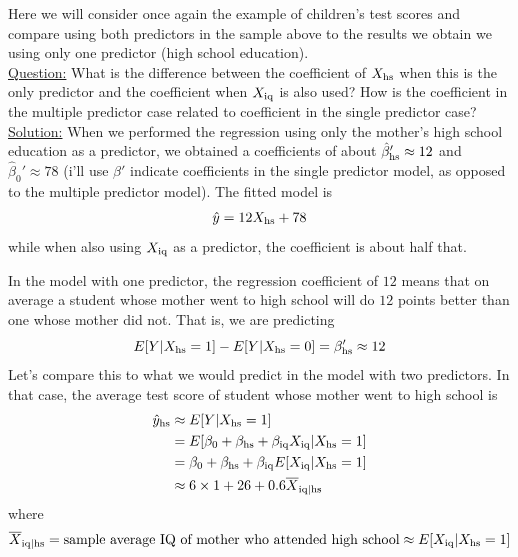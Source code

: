 \begin{example}
Here we will consider once again the example of children's test scores and compare using both predictors in the sample above to the results we obtain we using only one predictor (high school education). \\



\noindent
\underline{Question:} What is the difference between the coefficient of $X_{\rm hs}$ when this is the only predictor and the coefficient when $X_{\rm iq}$ is also used? How is the coefficient in the multiple predictor case related to coefficient in the single predictor case?  \\

\noindent
\underline{Solution:} When we performed the regression using only the mother's high school education as a predictor, we obtained a coefficients of about $\hat{\beta}_{\rm hs}' \approx 12$ and $\hat{\beta}_0' \approx 78$ (i'll use $\beta'$ indicate coefficients in the single predictor model, as opposed to the multiple predictor model). The fitted model is
\begin{equation*}
\hat{y} = 12X_{\rm hs} + 78 
\end{equation*}
while when also using $X_{\rm iq}$ as a predictor,  the coefficient is about half that.


In the model with one predictor, the regression coefficient of $12$ means that on average a student whose mother went to high school will do $12$ points better than one whose mother did not.  That is, we are predicting
\begin{equation*}
E[Y|X_{\rm hs} = 1]-E[Y|X_{\rm hs} = 0]  = \beta_{\rm hs}' \approx 12
\end{equation*}
Let's compare this to what we would predict in the model with two predictors. 
In that case, the average test score of student whose mother went to high school is
\begin{align*}
\hat{y}_{\rm hs} &\approx E[Y|X_{\rm hs} =1]\\
&=  E[\beta_0 +  \beta_{\rm hs} +\beta_{\rm iq}X_{\rm iq} |X_{\rm hs}=1]\\
&=\beta_0 +  \beta_{\rm hs} +\beta_{\rm iq}E[X_{\rm iq}|X_{\rm hs}=1]\\
&\approx  6\times 1+ 26  +  0.6 \overline{X}_{{\rm iq}|{\rm hs}} 
\end{align*}
where 
\begin{equation*}
\overline{X}_{{\rm iq}|{\rm hs}}  =  \text{sample average IQ of mother who attended high school} \approx E[X_{\rm iq}|X_{\rm hs}=1]
\end{equation*}


\end{example}
